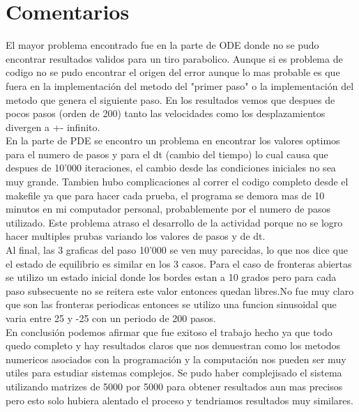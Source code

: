 \documentclass[12pt]{article}
\begin{document}
\section{Comentarios}
El mayor problema encontrado fue en la parte de ODE donde no se pudo encontrar resultados validos para un tiro parabolico. Aunque si es problema de codigo no se pudo encontrar el origen del error aunque lo mas probable es que fuera en la implementaci\'on del metodo del "primer paso" o la implementaci\'on del metodo que genera el siguiente paso. En los resultados vemos que despues de pocos pasos (orden de 200) tanto las velocidades como los desplazamientos divergen a +- infinito. 
\\
En la parte de PDE se encontro un problema en encontrar los valores optimos para el numero de pasos y para el dt (cambio del tiempo) lo cual causa que despues de 10'000 iteraciones, el cambio desde las condiciones iniciales no sea muy grande. Tambien hubo complicaciones al correr el codigo completo desde el makefile ya que para hacer cada prueba, el programa se demora mas de 10 minutos en mi computador personal, probablemente por el numero de pasos utilizado. Este problema atraso el desarrollo de la actividad porque no se logro hacer multiples prubas variando los valores de pasos y de dt.
\\
Al final, las 3 graficas del paso 10'000 se ven muy parecidas, lo que nos dice que el estado de equilibrio es similar en los 3 casos. Para el caso de fronteras abiertas se utilizo un estado inicial donde los bordes estan a 10 grados pero para cada paso subsecuente no se reitera este valor entonces quedan libres.No fue muy claro que son las fronteras periodicas entonces se utilizo una funcion sinusoidal que varia entre 25 y -25 con un periodo de 200 pasos.
\\
En conclusi\'on podemos afirmar que fue exitoso el trabajo hecho ya que todo quedo completo y hay resultados claros que nos demuestran como los metodos numericos asociados con la programaci\'on y la computaci\'on nos pueden ser muy utiles para estudiar sistemas complejos. Se pudo haber complejisado el sistema utilizando matrizes de 5000 por 5000 para obtener resultados aun mas precisos pero esto solo hubiera alentado el proceso y tendriamos resultados muy similares.
\end{document}
